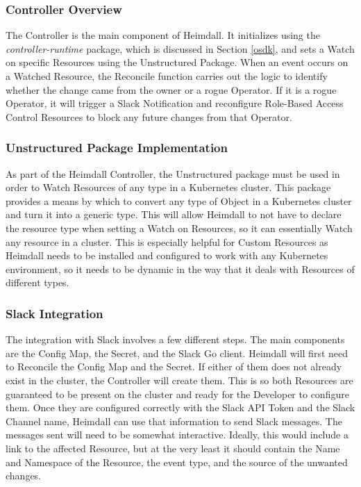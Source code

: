 \documentclass{article}
\begin{document}
\subsubsection{Controller Overview}

The Controller is the main component of Heimdall. It initializes using the \emph{controller-runtime} package, which is discussed in Section \ref{osdk}, and sets a Watch on specific Resources using the Unstructured Package. When an event occurs on a Watched Resource, the Reconcile function carries out the logic to identify whether the change came from the owner or a rogue Operator. If it is a rogue Operator, it will trigger a Slack Notification and reconfigure Role-Based Access Control Resources to block any future changes from that Operator.

\subsubsection{Unstructured Package Implementation}

As part of the Heimdall Controller, the Unstructured package must be used in order to Watch Resources of any type in a Kubernetes cluster. This package provides a means by which to convert any type of Object in a Kubernetes cluster and turn it into a generic type. This will allow Heimdall to not have to declare the resource type when setting a Watch on Resources, so it can essentially Watch any resource in a cluster. This is especially helpful for Custom Resources as Heimdall needs to be installed and configured to work with any Kubernetes environment, so it needs to be dynamic in the way that it deals with Resources of different types.

\subsubsection{Slack Integration}

The integration with Slack involves a few different steps. The main components are the Config Map, the Secret, and the Slack Go client. Heimdall will first need to Reconcile the Config Map and the Secret. If either of them does not already exist in the cluster, the Controller will create them. This is so both Resources are guaranteed to be present on the cluster and ready for the Developer to configure them. Once they are configured correctly with the Slack API Token and the Slack Channel name, Heimdall can use that information to send Slack messages. The messages sent will need to be somewhat interactive. Ideally, this would include a link to the affected Resource, but at the very least it should contain the Name and Namespace of the Resource, the event type, and the source of the unwanted changes.
\end{document}
